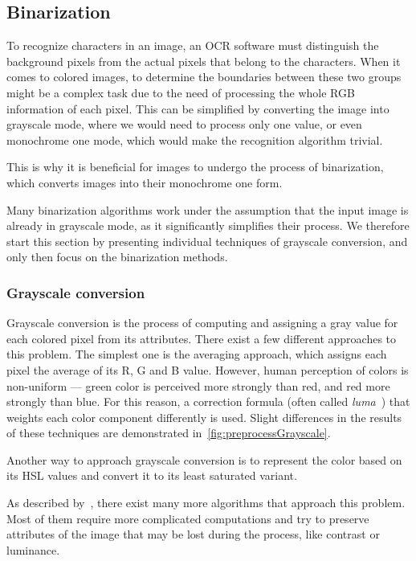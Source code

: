 \subsection{Binarization}

To recognize characters in an image, an OCR software must distinguish the background pixels from the actual pixels that belong to the characters. When it comes to colored images, to determine the boundaries between these two groups might be a complex task due to the need of processing the whole RGB information of each pixel. This can be simplified by converting the image into grayscale mode, where we would need to process only one value, or even monochrome one mode, which would make the recognition algorithm trivial.

This is why it is beneficial for images to undergo the process of binarization, which converts images into their monochrome one form.

Many binarization algorithms work under the assumption that the input image is already in grayscale mode, as it significantly simplifies their process. We therefore start this section by presenting individual techniques of grayscale conversion, and only then focus on the binarization methods.

\subsubsection{Grayscale conversion}

Grayscale conversion is the process of computing and assigning a gray value for each colored pixel from its attributes. There exist a few different approaches to this problem. The simplest one is the averaging approach, which assigns each pixel the average of its R, G and B value. However, human perception of colors is non-uniform --- green color is perceived more strongly than red, and red more strongly than blue. For this reason, a correction formula (often called \emph{luma}~\cite{grayscaleConv}) that weights each color component differently is used. Slight differences in the results of these techniques are demonstrated in~\cref{fig:preprocessGrayscale}.

Another way to approach grayscale conversion is to represent the color based on its HSL values and convert it to its least saturated variant.

As described by~\citet{grayscaleCadik}, there exist many more algorithms that approach this problem. Most of them require more complicated computations and try to preserve attributes of the image that may be lost during the process, like contrast or luminance.

